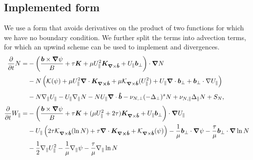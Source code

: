 \subsection{Implemented form}
We use a form that avoids derivatives on the product of two
functions for which we have no boundary condition.
We further split the terms into advection terms, for which an upwind scheme can be
used to implement and divergences.
\begin{subequations}
    \begin{align}
    \frac{\partial}{\partial t} N =&
        -\left( \frac{\vec b\times\vn \psi}{B}
        + \tau \vec K + \mu U_\parallel^2 \vec K_{\vn\times\bhat} +
        U_\parallel {\vec b}_\perp
    \right)\cn N
\nonumber \\ &
    \vphantom{\frac{\vec b\times\vn \psi}{B}} %
        - N \left( \mathcal K(\psi)
           +\mu U_\parallel^2\nc \vec{ K_{\vn\times\bhat}}
        +\mu \mathcal K_{\vn\times\bhat}(U_\parallel^2)
        + U_\parallel \nc { \vec b}_\perp
    + {\vec b}_\perp\cdot\nabla U_\parallel \right)
\nonumber \\&
    \vphantom{\frac{\vec b\times\vn \psi}{B}} %
    - N\npar U_\parallel - U_\parallel \npar N - NU_\parallel \nc \bhat
    - \nu_{N,\perp}(-\Delta_\perp)^s N + \nu_{N,\parallel}\Delta_\parallel N + S_N
    , \label{eq:EgyrofluidN}\\
    \frac{\partial}{\partial t} W_\parallel =&
      -\left( \frac{\vec b\times\vn \psi}{B}
          + \tau \vec K + (\mu U_\parallel^2 + 2\tau) \vec K_{\vn\times\bhat} +
        U_\parallel {\vec b}_\perp
    \right)\cn U_\parallel
\nonumber \\&
    \vphantom{\frac{\vec b\times\vn \psi}{B}} %
    - U_\parallel \left( 2\tau \mathcal K_{\vn\times\bhat}(\ln N)
        +\tau \nc\vec{ K_{\vn\times\bhat}}
        + \mathcal K_{\vn\times\bhat}(\psi)
        \right)
        - \frac{1}{\mu} {\vec b}_\perp\cn \psi%
        -\frac{\tau}{\mu} {\vec b}_\perp\cn \ln N
\nonumber \\&
    \vphantom{\frac{\vec b\times\vn \psi}{B}} %
        - \frac{1}{2}\npar U_\parallel^2
        - \frac{1}{\mu} \npar \psi%
        -\frac{\tau}{\mu} \npar \ln N

\end{align}
\end{subequations}
